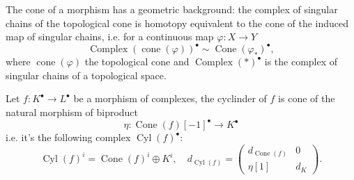 The cone of a morphism has a geometric background: 
the complex of singular chains of the topological cone is homotopy equivalent to the cone of the induced map of singular chains, i.e. for a continuous map $\varphi:X\to Y$
\[
	\operatorname{Complex}(\operatorname{cone}(\varphi))^\bullet 
	\sim \operatorname{Cone}(\varphi_*)^\bullet,
\]
where $\operatorname{cone}(\varphi)$ the topological cone and 
$\operatorname{Complex}(*)^\bullet$ is the complex of singular chains of a topological space.


\begin{definition}
	Let $f:K^\bullet\to L^\bullet$ be a morphism of complexes,
	the cyclinder of $f$ is cone of the natural morphism of biproduct
	\[
		\eta:\operatorname{Cone}(f)[-1]^\bullet \to K^\bullet
	\]
	i.e. it's the following complex $\operatorname{Cyl}(f)^\bullet$:
	\[
		\operatorname{Cyl}(f)^i=\operatorname{Cone}(f)^i\oplus K^{i} ,\quad
		d_{\operatorname{Cyl}(f)}=\begin{pmatrix}
			d_{\operatorname{Cone}(f)}&0\\
			\eta[1] & d_{K}
		\end{pmatrix}.
	\]
\end{definition}

